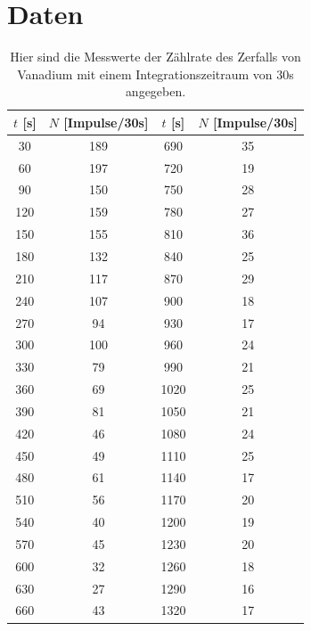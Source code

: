 \documentclass[titlepage = firstcover]{scrartcl}
\begin{document}
    \section{Daten}
        \begin{table}[h]
            \centering
            \caption{Hier sind die Messwerte der Zählrate des Zerfalls von Vanadium mit einem Integrationszeitraum von 30s angegeben.}
            \label{tab:Vanadium}
            \begin{tabular}{c c c c}
            \toprule
            {$t$ [s]} & {$N$ [Impulse/30s]} & {$t$ [s]} & {$N$ [Impulse/30s]} \\
            \midrule
            30	 &  189  &  690   &  35 \\
            60	 &  197  &  720   &  19 \\
            90	 &  150  &  750   &  28 \\
            120	 &  159  &  780   &  27 \\
            150	 &  155  &  810   &  36 \\
            180	 &  132  &  840   &  25 \\
            210	 &  117  &  870   &  29 \\
            240	 &  107  &  900   &  18 \\
            270	 &  94   &  930   &  17 \\
            300	 &  100  &  960   &  24 \\
            330	 &  79   &  990   &  21 \\
            360	 &  69   &  1020  &  25 \\
            390	 &  81   &  1050  &  21 \\
            420	 &  46   &  1080  &  24 \\
            450	 &  49   &  1110  &  25 \\
            480	 &  61   &  1140  &  17 \\
            510	 &  56   &  1170  &  20 \\
            540	 &  40   &  1200  &  19 \\
            570	 &  45   &  1230  &  20 \\
            600	 &  32   &  1260  &  18 \\
            630	 &  27   &  1290  &  16 \\
            660	 &  43   &  1320  &  17 \\                        
            \bottomrule
            \end{tabular}
        \end{table}
\end{document}

